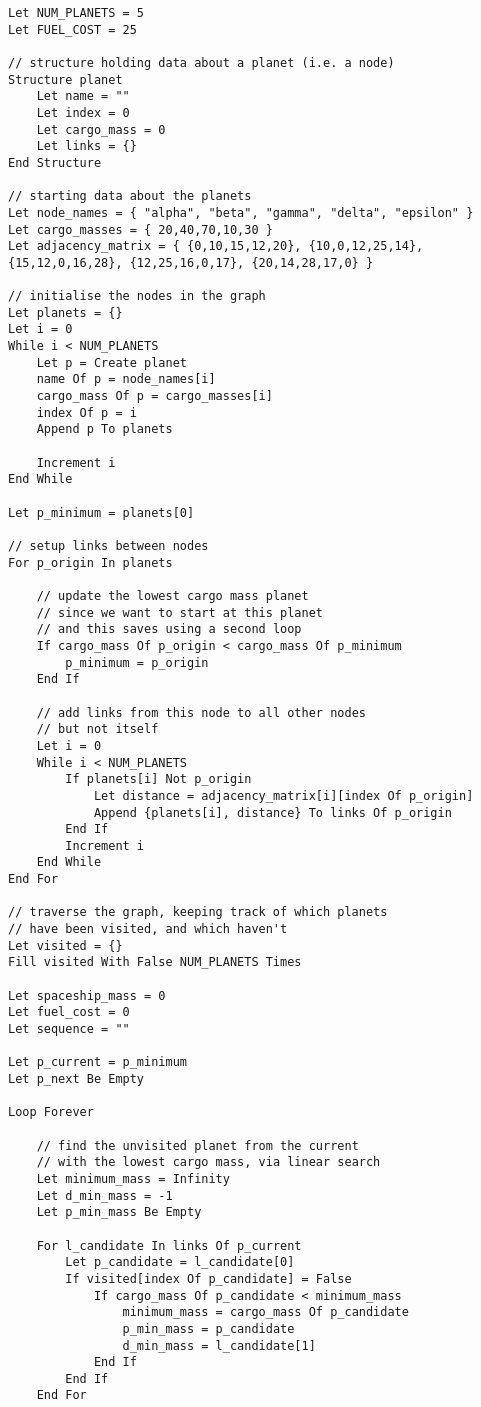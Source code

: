 \documentclass[
]{article}
\begin{document}
\begin{verbatim}
Let NUM_PLANETS = 5
Let FUEL_COST = 25

// structure holding data about a planet (i.e. a node)
Structure planet
    Let name = ""
    Let index = 0
    Let cargo_mass = 0
    Let links = {}
End Structure

// starting data about the planets
Let node_names = { "alpha", "beta", "gamma", "delta", "epsilon" }
Let cargo_masses = { 20,40,70,10,30 }
Let adjacency_matrix = { {0,10,15,12,20}, {10,0,12,25,14}, {15,12,0,16,28}, {12,25,16,0,17}, {20,14,28,17,0} }

// initialise the nodes in the graph
Let planets = {}
Let i = 0
While i < NUM_PLANETS
    Let p = Create planet
    name Of p = node_names[i]
    cargo_mass Of p = cargo_masses[i]
    index Of p = i
    Append p To planets
    
    Increment i
End While

Let p_minimum = planets[0]

// setup links between nodes
For p_origin In planets

    // update the lowest cargo mass planet
    // since we want to start at this planet
    // and this saves using a second loop
    If cargo_mass Of p_origin < cargo_mass Of p_minimum
        p_minimum = p_origin
    End If

    // add links from this node to all other nodes
    // but not itself
    Let i = 0
    While i < NUM_PLANETS
        If planets[i] Not p_origin
            Let distance = adjacency_matrix[i][index Of p_origin]
            Append {planets[i], distance} To links Of p_origin
        End If
        Increment i
    End While
End For

// traverse the graph, keeping track of which planets
// have been visited, and which haven't
Let visited = {}
Fill visited With False NUM_PLANETS Times

Let spaceship_mass = 0
Let fuel_cost = 0
Let sequence = ""

Let p_current = p_minimum
Let p_next Be Empty

Loop Forever

    // find the unvisited planet from the current
    // with the lowest cargo mass, via linear search
    Let minimum_mass = Infinity
    Let d_min_mass = -1
    Let p_min_mass Be Empty

    For l_candidate In links Of p_current
        Let p_candidate = l_candidate[0]
        If visited[index Of p_candidate] = False
            If cargo_mass Of p_candidate < minimum_mass
                minimum_mass = cargo_mass Of p_candidate
                p_min_mass = p_candidate
                d_min_mass = l_candidate[1]
            End If
        End If
    End For


\end{verbatim}
\end{document}
